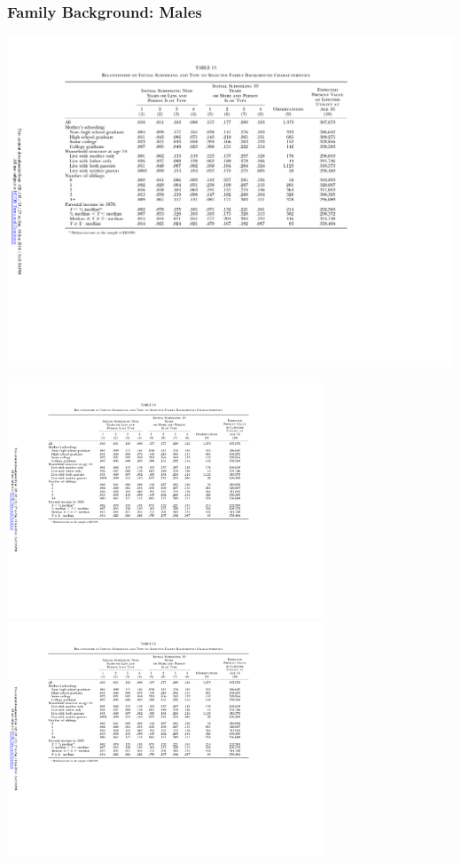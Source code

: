 \begin{frame}
	\frametitle{Family Background: Males}
	\includegraphics[width=\textwidth]{tab-figs/table13_1997_header}	\\
	\begin{center}
	\includegraphics[height=2.75in]{tab-figs/table13_1997_left} \includegraphics[height=2.75in]{tab-figs/table13a_1997}	\\

\end{center}
\end{frame}
